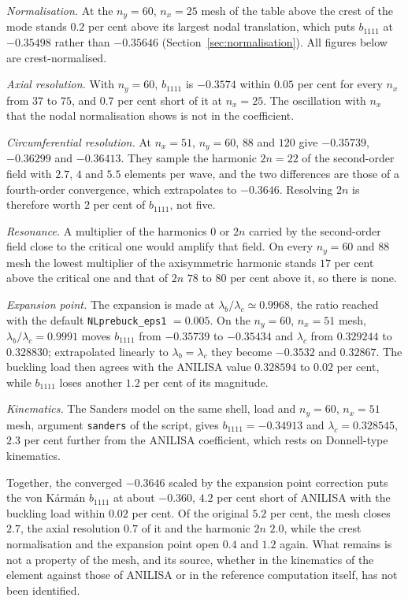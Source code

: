 \documentclass[11pt,a4paper]{article}
\begin{document}
\emph{Normalisation.}  At the $n_y = 60$, $n_x = 25$ mesh of the table above
the crest of the mode stands $0.2$ per cent above its largest nodal
translation, which puts $b_{1111}$ at $-0.35498$ rather than $-0.35646$
(Section~\ref{sec:normalisation}).  All figures below are crest-normalised.

\emph{Axial resolution.}  With $n_y = 60$, $b_{1111}$ is $-0.3574$ within $0.05$
per cent for every $n_x$ from $37$ to $75$, and $0.7$ per cent short of it at
$n_x = 25$.  The oscillation with $n_x$ that the nodal normalisation shows is
not in the coefficient.

\emph{Circumferential resolution.}  At $n_x = 51$, $n_y = 60$, $88$ and $120$
give $-0.35739$, $-0.36299$ and $-0.36413$.  They sample the harmonic $2n = 22$
of the second-order field with $2.7$, $4$ and $5.5$ elements per wave, and the
two differences are those of a fourth-order convergence, which extrapolates to
$-0.3646$.  Resolving $2n$ is therefore worth $2$ per cent of $b_{1111}$, not
five.

\emph{Resonance.}  A multiplier of the harmonics $0$ or $2n$ carried by the
second-order field close to the critical one would amplify that field.  On
every $n_y = 60$ and $88$ mesh the lowest multiplier of the axisymmetric
harmonic stands $17$ per cent above the critical one and that of $2n$ $78$ to
$80$ per cent above it, so there is none.

\emph{Expansion point.}  The expansion is made at $\lambda_b/\lambda_c
\simeq 0.9968$, the ratio reached with the default
\texttt{NLprebuck\_eps1} $= 0.005$.  On the $n_y = 60$,
$n_x = 51$ mesh, $\lambda_b/\lambda_c = 0.9991$ moves $b_{1111}$ from $-0.35739$
to $-0.35434$ and $\lambda_c$ from $0.329244$ to $0.328830$; extrapolated
linearly to $\lambda_b = \lambda_c$ they become $-0.3532$ and $0.32867$.  The
buckling load then agrees with the ANILISA value $0.328594$ to $0.02$ per cent,
while $b_{1111}$ loses another $1.2$ per cent of its magnitude.

\emph{Kinematics.}  The Sanders model on the same shell, load and
$n_y = 60$, $n_x = 51$ mesh, argument \texttt{sanders} of the script, gives
$b_{1111} = -0.34913$ and $\lambda_c = 0.328545$, $2.3$ per cent further from
the ANILISA coefficient, which rests on Donnell-type kinematics.

Together, the converged $-0.3646$ scaled by the expansion point correction
puts the von K\'arm\'an $b_{1111}$ at about $-0.360$, $4.2$ per cent short of
ANILISA with the buckling load within $0.02$ per cent.  Of the original
$5.2$ per cent, the mesh closes $2.7$, the axial resolution $0.7$ of it and
the harmonic $2n$ $2.0$, while the crest normalisation and the expansion point
open $0.4$ and $1.2$ again.  What remains is not a property of the mesh, and
its source, whether in the kinematics of the element against those of ANILISA
or in the reference computation itself, has not been identified.
\end{document}
